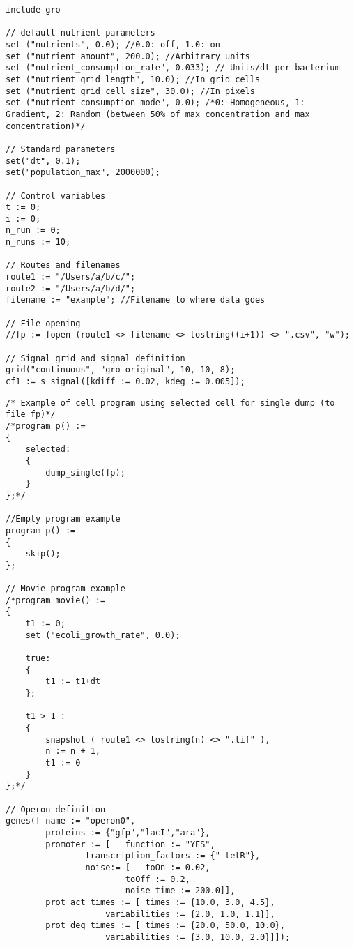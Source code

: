 \documentclass[10pt,a4paper]{article}
\begin{document}
\begin{Verbatim}[obeytabs]
include gro

// default nutrient parameters
set ("nutrients", 0.0); //0.0: off, 1.0: on
set ("nutrient_amount", 200.0); //Arbitrary units
set ("nutrient_consumption_rate", 0.033); // Units/dt per bacterium
set ("nutrient_grid_length", 10.0); //In grid cells
set ("nutrient_grid_cell_size", 30.0); //In pixels
set ("nutrient_consumption_mode", 0.0); /*0: Homogeneous, 1:
Gradient, 2: Random (between 50% of max concentration and max
concentration)*/

// Standard parameters
set("dt", 0.1);
set("population_max", 2000000);

// Control variables
t := 0;
i := 0;
n_run := 0;
n_runs := 10;

// Routes and filenames
route1 := "/Users/a/b/c/";
route2 := "/Users/a/b/d/";
filename := "example"; //Filename to where data goes

// File opening
//fp := fopen (route1 <> filename <> tostring((i+1)) <> ".csv", "w");

// Signal grid and signal definition
grid("continuous", "gro_original", 10, 10, 8);
cf1 := s_signal([kdiff := 0.02, kdeg := 0.005]);
\end{Verbatim}

\newpage

\begin{Verbatim}[obeytabs]
/* Example of cell program using selected cell for single dump (to
file fp)*/
/*program p() :=
{
	selected: 
	{
		dump_single(fp);
	}
};*/

//Empty program example
program p() :=
{
	skip(); 
};

// Movie program example
/*program movie() :=
{
	t1 := 0;
	set ("ecoli_growth_rate", 0.0);
	
	true: 
	{
		t1 := t1+dt
	};
	
	t1 > 1 : 
	{
		snapshot ( route1 <> tostring(n) <> ".tif" ),
		n := n + 1,
		t1 := 0
	}
};*/
	
// Operon definition
genes([	name := "operon0",
		proteins := {"gfp","lacI","ara"},
		promoter := [	function := "YES",
				transcription_factors := {"-tetR"},
				noise:= [	toOn := 0.02,
						toOff := 0.2,
						noise_time := 200.0]],
		prot_act_times := [	times := {10.0, 3.0, 4.5},
					variabilities := {2.0, 1.0, 1.1}],
		prot_deg_times := [	times := {20.0, 50.0, 10.0},
					variabilities := {3.0, 10.0, 2.0}]]);

\end{Verbatim}
\end{document}
